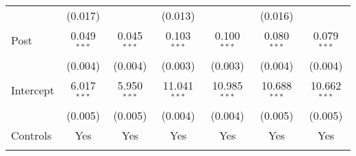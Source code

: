 \begin{tabular}{@{\extracolsep{5pt}}lcccccc}
                        & (0.017)                                                              &                   & (0.013)           &                   & (0.016)           &                   \\
    Post                & 0.049$^{***}$                                                        & 0.045$^{***}$     & 0.103$^{***}$     & 0.100$^{***}$     & 0.080$^{***}$     & 0.079$^{***}$     \\
                        & (0.004)                                                              & (0.004)           & (0.003)           & (0.003)           & (0.004)           & (0.004)           \\
    Intercept           & 6.017$^{***}$                                                        & 5.950$^{***}$     & 11.041$^{***}$    & 10.985$^{***}$    & 10.688$^{***}$    & 10.662$^{***}$    \\
                        & (0.005)                                                              & (0.005)           & (0.004)           & (0.004)           & (0.005)           & (0.005)           \\
    Controls            & Yes                                                                  & Yes               & Yes               & Yes               & Yes               & Yes               \\
    \hline                                                                                                                                                                                         \\[-1.8ex]

\end{tabular}
